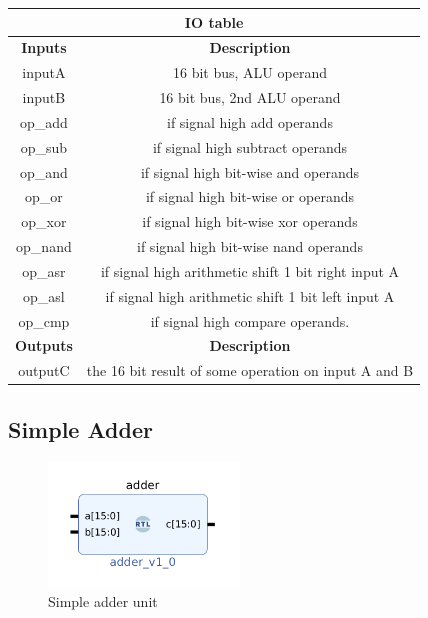 \documentclass{article}
\begin{document}
\begin{par}
	\begin{center}
		\begin{tabular}{|c|c|}
			\hline 
			\multicolumn{2}{|c|}{\textbf{IO table}} \\
			\hline 
			\textbf{Inputs} & \textbf{Description} \\ 
			\hline 
			inputA & 16 bit bus, ALU operand \\ 
			\hline 
			inputB & 16 bit bus, 2nd ALU operand \\
			\hline
			op\_add & if signal high add operands \\
			\hline
			op\_sub & if signal high subtract operands \\
			\hline
			op\_and & if signal high bit-wise and operands \\
			\hline
			op\_or & if signal high bit-wise or operands \\
			\hline
			op\_xor & if signal high bit-wise xor operands \\
			\hline
			op\_nand & if signal high bit-wise nand operands \\
			\hline
			op\_asr & if signal high arithmetic shift 1 bit right input A \\
			\hline
			op\_asl & if signal high arithmetic shift 1 bit left input A \\
			\hline
			op\_cmp & if signal high compare operands. \\
			\hline
			\textbf{Outputs} & \textbf{Description} \\ 
			\hline 
			outputC & the 16 bit result of some operation on input A and B \\
			\hline
		\end{tabular} 
	\end{center}

	\subsection{Simple Adder}
	
	\begin{figure}[H]
		\centering
		\includegraphics[width=2in]{img/simpleAddr.png}
		\caption{Simple adder unit}
	\end{figure}
	

\end{par}
\end{document}
